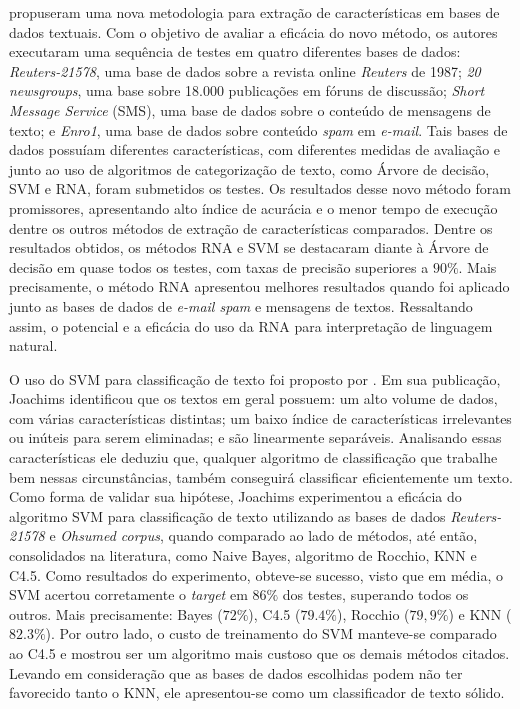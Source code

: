 \cite{uysal2012novel} propuseram uma nova metodologia para extração de características em bases de dados textuais. Com o objetivo de avaliar a eficácia do novo método, os autores executaram uma sequência de testes em quatro diferentes bases de dados: \textit{Reuters-21578}, uma base de dados sobre a revista online \textit{Reuters} de 1987; \textit{20 newsgroups}, uma base sobre 18.000 publicações em fóruns de discussão; \textit{Short Message Service} (SMS), uma base de dados sobre o conteúdo de mensagens de texto; e \textit{Enro1}, uma base de dados sobre conteúdo \textit{spam} em \textit{e-mail}. Tais bases de dados possuíam diferentes características, com diferentes medidas de avaliação e junto ao uso de algoritmos de categorização de texto, como Árvore de decisão, SVM e RNA, foram submetidos os testes. Os resultados desse novo método foram promissores, apresentando alto índice de acurácia e o menor tempo de execução dentre os outros métodos de extração de características comparados. Dentre os resultados obtidos, os métodos RNA e SVM se destacaram diante à Árvore de decisão em quase todos os testes, com taxas de precisão superiores a $90\%$. Mais precisamente, o método RNA apresentou melhores resultados quando foi aplicado junto as bases de dados de \textit{e-mail spam} e mensagens de textos. Ressaltando assim, o potencial e a eficácia do uso da RNA para interpretação de linguagem natural.

O uso do SVM para classificação de texto foi proposto por \cite{joachims1998text}. Em sua publicação, Joachims identificou que os textos em geral possuem: um alto volume de dados, com várias características distintas; um baixo índice de características irrelevantes ou inúteis para serem eliminadas; e são linearmente separáveis. Analisando essas características ele deduziu que, qualquer algoritmo de classificação que trabalhe bem nessas circunstâncias, também conseguirá classificar eficientemente um texto. Como forma de validar sua hipótese, Joachims experimentou a eficácia do algoritmo SVM para classificação de texto utilizando as bases de dados \textit{Reuters-21578} e \textit{Ohsumed corpus}, quando comparado ao lado de métodos, até então, consolidados na literatura, como Naive Bayes, algoritmo de Rocchio, KNN e C4.5. Como resultados do experimento, obteve-se sucesso, visto que em média, o SVM acertou corretamente o \textit{target} em $86\%$ dos testes, superando todos os outros. Mais precisamente: Bayes ($72\%$), C4.5 ($79.4\%$), Rocchio ($79,9\%$) e KNN ($82.3\%$). Por outro lado, o custo de treinamento do SVM manteve-se comparado ao C4.5 e mostrou ser um algoritmo mais custoso que os demais métodos citados. Levando em consideração que as bases de dados escolhidas podem não ter favorecido tanto o KNN, ele apresentou-se como um classificador de texto sólido.

